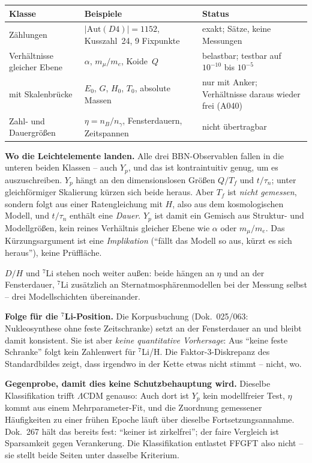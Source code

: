 \begin{center}
\begin{tabular}{llp{4.6cm}}
\toprule
Klasse & Beispiele & Status \\
\midrule
Zählungen & $|\text{Aut}(D4)| = 1152$, Kusszahl~24,
  9 Fixpunkte & exakt; Sätze, keine Messungen \\
Verhältnisse gleicher Ebene & $\alpha$, $m_\mu/m_e$,
  Koide~$Q$ & belastbar; testbar auf
  $10^{-10}$ bis $10^{-5}$ \\
mit Skalenbrücke & $E_0$, $G$, $H_0$, $T_0$,
  absolute Massen & nur mit Anker; Verhältnisse daraus wieder
  frei (A040) \\
Zahl- und Dauergrößen & $\eta = n_B/n_\gamma$, Fensterdauern,
  Zeitspannen & nicht übertragbar \\
\bottomrule
\end{tabular}
\end{center}

\textbf{Wo die Leichtelemente landen.} Alle drei
BBN-Observablen fallen in die unteren beiden Klassen -- auch
$Y_p$, und das ist kontraintuitiv genug, um es auszuschreiben.
$Y_p$ hängt an den dimensionslosen Größen $Q/T_f$ und
$t/\tau_n$; unter gleichförmiger Skalierung kürzen sich beide
heraus. Aber $T_f$ ist \emph{nicht gemessen}, sondern folgt aus
einer Ratengleichung mit $H$, also aus dem kosmologischen Modell,
und $t/\tau_n$ enthält eine \emph{Dauer}. $Y_p$ ist damit ein
Gemisch aus Struktur- und Modellgrößen, kein reines Verhältnis
gleicher Ebene wie $\alpha$ oder $m_\mu/m_e$. Das Kürzungsargument
ist eine \emph{Implikation} (\enquote{fällt das Modell so aus,
kürzt es sich heraus}), keine Prüffläche.

$D/H$ und ${}^7$Li stehen noch weiter außen: beide hängen an
$\eta$ und an der Fensterdauer, ${}^7$Li zusätzlich an
Sternatmosphärenmodellen bei der Messung selbst -- drei
Modellschichten übereinander.

\textbf{Folge für die ${}^7$Li-Position.} Die Korpusbuchung
(Dok.~025/063: Nukleosynthese ohne feste Zeitschranke) setzt an
der Fensterdauer an und bleibt damit konsistent. Sie ist aber
\emph{keine quantitative Vorhersage}: Aus \enquote{keine feste
Schranke} folgt kein Zahlenwert für ${}^7$Li/H. Die
Faktor-3-Diskrepanz des Standardbildes zeigt, dass irgendwo in
der Kette etwas nicht stimmt -- nicht, wo.

\textbf{Gegenprobe, damit dies keine Schutzbehauptung wird.}
Dieselbe Klassifikation trifft $\Lambda$CDM genauso: Auch dort
ist $Y_p$ kein modellfreier Test, $\eta$ kommt aus einem
Mehrparameter-Fit, und die Zuordnung gemessener Häufigkeiten zu
einer frühen Epoche läuft über dieselbe Fortsetzungsannahme.
Dok.~267 hält das bereits fest: \enquote{keiner ist zirkelfrei};
der faire Vergleich ist Sparsamkeit gegen Verankerung. Die
Klassifikation entlastet FFGFT also nicht -- sie stellt beide
Seiten unter dasselbe Kriterium.

